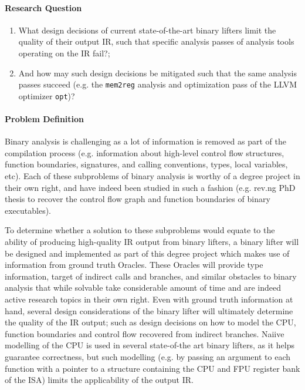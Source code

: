 \documentclass[12pt, a4paper]{article}
\begin{document}
\paragraph{Research Question}

\begin{enumerate}
	\item What design decisions of current state-of-the-art binary lifters limit the quality of their output IR, such that specific analysis passes of analysis tools operating on the IR fail?;
	\item And how may such design decisions be mitigated such that the same analysis passes succeed (e.g. the \texttt{mem2reg} analysis and optimization pass of the LLVM optimizer \texttt{opt})?
\end{enumerate}


\paragraph{Problem Definition}

Binary analysis is challenging as a lot of information is removed as part of the compilation process (e.g. information about high-level control flow structures, function boundaries, signatures, and calling conventions, types, local variables, etc). Each of these subproblems of binary analysis is worthy of a degree project in their own right, and have indeed been studied in such a fashion (e.g. rev.ng PhD thesis \cite{revng} to recover the control flow graph and function boundaries of binary executables).

To determine whether a solution to these subproblems would equate to the ability of producing high-quality IR output from binary lifters, a binary lifter will be designed and implemented as part of this degree project which makes use of information from ground truth Oracles. These Oracles will provide type information, target of indirect calls and branches, and similar obstacles to binary analysis that while solvable take considerable amount of time and are indeed active research topics in their own right. Even with ground truth information at hand, several design considerations of the binary lifter will ultimately determine the quality of the IR output; such as design decisions on how to model the CPU, function boundaries and control flow recovered from indirect branches. Naiive modelling of the CPU is used in several state-of-the art binary lifters, as it helps guarantee correctness, but such modelling (e.g. by passing an argument to each function with a pointer to a structure containing the CPU and FPU register bank of the ISA) limits the applicability of the output IR.
\end{document}
